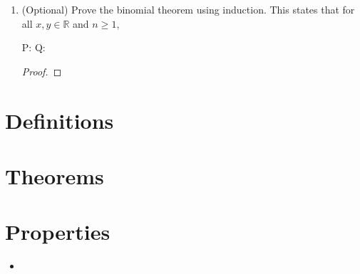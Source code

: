 \documentclass{article} %
\theoremstyle{plain}
\theoremstyle{definition}
\theoremstyle{case}
\begin{document}
\begin{enumerate}[label={\fbox{\textbf{Exercise \#\arabic* :}}}]
\begin{proof}[\textbf{Proof by contradiction}]
    The equation becomes
    \[
      \left( \frac{p}{q}\right) ^n
        + a_{n-1}\left( \frac{p}{q}\right) ^{n-1}
        + \dots + a_{1}\left( \frac{p}{q}\right)^{1}
        + a_0 = 0
      \]
      Moving $a_0$, we get 
    \[
      \left( \frac{p}{q}\right) ^n
        + a_{n-1}\left( \frac{p}{q}\right) ^{n-1}
        + \dots + a_{1}\left( \frac{p}{q}\right)^{1}
        = - a_0
      \]
      Factoring out $\left( \frac{p}{q} \right)^n$ we have
    \[
      \left( \frac{p}{q}\right) ^n \left(
        a_{n-1}\left( \frac{p}{q}\right) ^{-1}
        + \dots +
        a_{1}\left( \frac{p}{q}\right)^{1-n}
        \right)
        = - a_0
      \]
      However, since $a_0 \in \mathbb{Z} , \left( \frac{p}{q} \right)^n$
       divides  $a_0$, $\left( \frac{p}{q} \right)^n$ must be an integer.

  \end{proof} 
  \renewcommand\qedsymbol{$\square$}
\newpage
\item (Optional) Prove the binomial theorem using induction. This states that for all $x,y \in \mathbb{R}$ and $n\geq 1$,


P: 
Q:

\begin{proof}
\end{proof} 

\newpage
\end{enumerate}

\newpage

\section*{Definitions}

\section*{Theorems}

\section*{Properties}
  \begin{itemize}
        \item
  \end{itemize}
\end{document}
